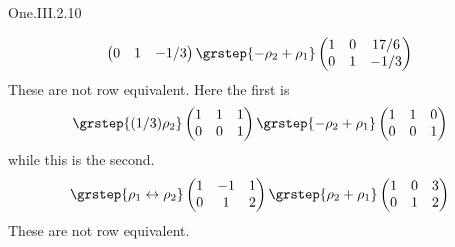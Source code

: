 \begin{ans}{One.III.2.10}
\begin{exparts}
\begin{equation*}
\begin{pmatrix}
              0  &1  &-1/3
            \end{pmatrix}
            \grstep{-\rho_2+\rho_1}
            \begin{pmatrix}
              1  &0  &17/6 \\
              0  &1  &-1/3
            \end{pmatrix}
          \end{equation*}
          These are not row equivalent.
        \partsitem Here the first is
          \begin{equation*}
            \grstep{(1/3)\rho_2}
            \begin{pmatrix}
              1  &1  &1  \\
              0  &0  &1
            \end{pmatrix}
            \grstep{-\rho_2+\rho_1}
            \begin{pmatrix}
              1  &1  &0  \\
              0  &0  &1
            \end{pmatrix}
          \end{equation*}
          while this is the second.
          \begin{equation*}
            \grstep{\rho_1\leftrightarrow\rho_2}
            \begin{pmatrix}
              1  &-1 &1  \\
              0  &1  &2
            \end{pmatrix}
            \grstep{\rho_2+\rho_1}
            \begin{pmatrix}
              1  &0  &3  \\
              0  &1  &2
            \end{pmatrix}
          \end{equation*}
          These are not row equivalent.
       \end{exparts}
     
\end{ans}

